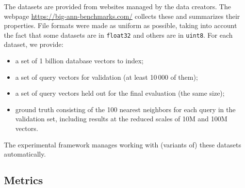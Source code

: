 The datasets are provided from websites managed by the data creators. 
The webpage \url{https://big-ann-benchmarks.com/} collects these and summarizes their properties.
File formats were made as uniform as possible, taking into account the fact that some datasets are 
in \texttt{float32} and others are in \texttt{uint8}.
For each dataset, we provide: 
\begin{itemize} 
  \item a set of 1 billion database vectors to index; 
	\item a set of query vectors for validation (at least 10\,000 of them); 
	\item a set of query vectors held out for the final evaluation (the same size);
	\item ground truth consisting of the 100 nearest neighbors for each query in the validation set, including results at the reduced scales of 10M and 100M vectors.
\end{itemize}
The experimental framework manages working with (variants of) these datasets automatically.






\subsection{Metrics}
\label{metrics}


